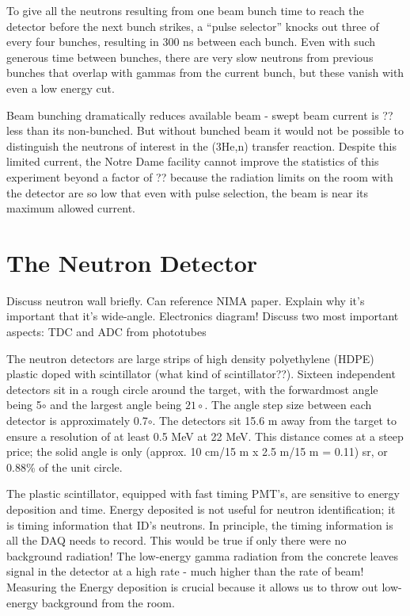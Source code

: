 
To give all the neutrons resulting from one beam bunch time to reach the detector before the next bunch strikes, a ``pulse selector'' knocks out three of every four bunches, resulting in 300 ns between each bunch.  Even with such generous time between bunches, there are very slow neutrons from previous bunches that overlap with gammas from the current bunch, but these vanish with even a low energy cut.


Beam bunching dramatically reduces available beam - swept beam current is ?? less than its non-bunched.  But without bunched beam it would not be possible to distinguish the neutrons of interest in the (3He,n) transfer reaction.  Despite this limited current, the Notre Dame facility cannot improve the statistics of this experiment beyond a factor of ?? because the radiation limits on the room with the detector are so low that even with pulse selection, the beam is near its maximum allowed current.


\section{The Neutron Detector}
Discuss neutron wall briefly.  Can reference NIMA paper. Explain why it's important that it's wide-angle. 
Electronics diagram!  Discuss two most important aspects: TDC and ADC from phototubes

The neutron detectors are large strips of high density polyethylene (HDPE) plastic doped with scintillator (what kind of scintillator??).  Sixteen independent detectors sit in a rough circle around the target, with the forwardmost angle being 5$\circ$ and the largest angle being $21\circ$.  The angle step size between each detector is approximately 0.7$\circ$.  The detectors sit 15.6 m away from the target to ensure a resolution of at least 0.5 MeV at 22 MeV.  This distance comes at a steep price; the solid angle is only (approx. 10 cm/15 m x 2.5 m/15 m = 0.11) sr, or 0.88\% of the unit circle.


The plastic scintillator, equipped with fast timing PMT's, are sensitive to energy deposition and time.  Energy deposited is not useful for neutron identification; it is timing information that ID's neutrons.  In principle, the timing information is all the DAQ needs to record.  This would be true if only there were no background radiation!  The low-energy gamma radiation from the concrete leaves signal in the detector at a high rate - much higher than the rate of beam! Measuring the Energy deposition is crucial because it allows us to throw out low-energy background from the room.  

